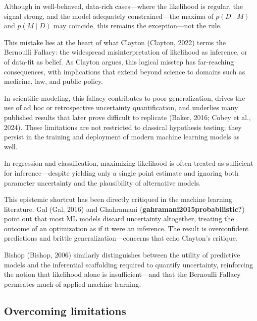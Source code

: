 \documentclass[
]{agujournal2019}
\begin{document}
Although in well-behaved, data-rich cases---where the likelihood is
regular, the signal strong, and the model adequately constrained---the
maxima of \(p(D \mid M)\) and \(p(M \mid D)\) may coincide, this remains
the exception---not the rule.

This mistake lies at the heart of what Clayton (Clayton, 2022) terms the
Bernoulli Fallacy: the widespread misinterpretation of likelihood as
inference, or of data-fit as belief. As Clayton argues, this logical
misstep has far-reaching consequences, with implications that extend
beyond science to domains such as medicine, law, and public policy.

In scientific modeling, this fallacy contributes to poor generalization,
drives the use of ad hoc or retrospective uncertainty quantification,
and underlies many published results that later prove difficult to
replicate (Baker, 2016; Cobey et al., 2024). These limitations are not
restricted to classical hypothesis testing; they persist in the training
and deployment of modern machine learning models as well.

In regression and classification, maximizing likelihood is often treated
as sufficient for inference---despite yielding only a single point
estimate and ignoring both parameter uncertainty and the plausibility of
alternative models.

This epistemic shortcut has been directly critiqued in the machine
learning literature. Gal (Gal, 2016) and Ghahramani
(\textbf{gahramani2015probabilistic?}) point out that most ML models
discard uncertainty altogether, treating the outcome of an optimization
as if it were an inference. The result is overconfident predictions and
brittle generalization---concerns that echo Clayton's critique.

Bishop (Bishop, 2006) similarly distinguishes between the utility of
predictive models and the inferential scaffolding required to quantify
uncertainty, reinforcing the notion that likelihood alone is
insufficient---and that the Bernoulli Fallacy permeates much of applied
machine learning.

\subsection{Overcoming limitations}\label{overcoming-limitations}
\end{document}
